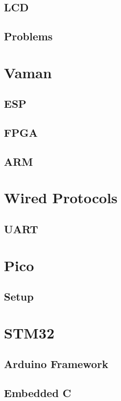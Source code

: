 \documentclass[journal]{IEEEtran}
\begin{document}
\subsection{LCD}

\subsection{Problems}

\newpage
\section{Vaman}
\subsection{ESP}
%

\subsection{FPGA}

\subsection{ARM}

\newpage
\section{Wired Protocols}
\subsection{UART}

\section{Pico}
\subsection{Setup}

\newpage
\section{STM32}
\subsection{Arduino Framework}

\subsection{Embedded C}

\end{document}
